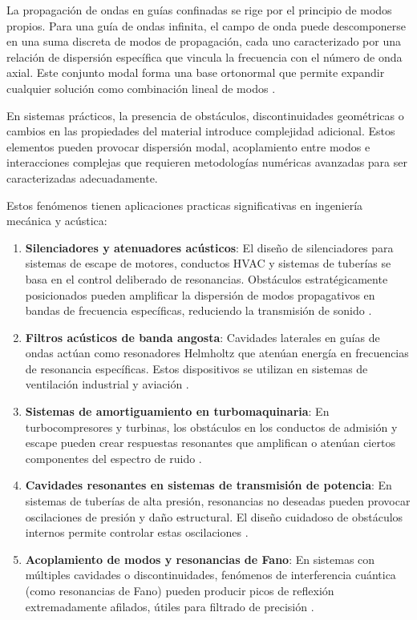 \documentclass[11pt]{article}
\begin{document}
La propagación de ondas en guías confinadas se rige por el principio de modos propios. Para una guía de ondas infinita, el campo de onda puede descomponerse en una suma discreta de modos de propagación, cada uno caracterizado por una relación de dispersión específica que vincula la frecuencia con el número de onda axial. Este conjunto modal forma una base ortonormal que permite expandir cualquier solución como combinación lineal de modos \cite{Dostart2017}.

En sistemas prácticos, la presencia de obstáculos, discontinuidades geométricas o cambios en las propiedades del material introduce complejidad adicional. Estos elementos pueden provocar dispersión modal, acoplamiento entre modos e interacciones complejas que requieren metodologías numéricas avanzadas para ser caracterizadas adecuadamente.

Estos fenómenos tienen aplicaciones practicas significativas en ingeniería mecánica y acústica:

\begin{enumerate}
\item \textbf{Silenciadores y atenuadores acústicos}: El diseño de silenciadores para sistemas de escape de motores, conductos HVAC y sistemas de tuberías se basa en el control deliberado de resonancias. Obstáculos estratégicamente posicionados pueden amplificar la dispersión de modos propagativos en bandas de frecuencia específicas, reduciendo la transmisión de sonido \cite{Kirby2005}.

\item \textbf{Filtros acústicos de banda angosta}: Cavidades laterales en guías de ondas actúan como resonadores Helmholtz que atenúan energía en frecuencias de resonancia específicas. Estos dispositivos se utilizan en sistemas de ventilación industrial y aviación \cite{Alkuhayli2025}.

\item \textbf{Sistemas de amortiguamiento en turbomaquinaria}: En turbocompresores y turbinas, los obstáculos en los conductos de admisión y escape pueden crear respuestas resonantes que amplifican o atenúan ciertos componentes del espectro de ruido \cite{Rämmal2009}.

\item \textbf{Cavidades resonantes en sistemas de transmisión de potencia}: En sistemas de tuberías de alta presión, resonancias no deseadas pueden provocar oscilaciones de presión y daño estructural. El diseño cuidadoso de obstáculos internos permite controlar estas oscilaciones \cite{Hein2012}.

\item \textbf{Acoplamiento de modos y resonancias de Fano}: En sistemas con múltiples cavidades o discontinuidades, fenómenos de interferencia cuántica (como resonancias de Fano) pueden producir picos de reflexión extremadamente afilados, útiles para filtrado de precisión \cite{Kronowetter2023}.

\end{enumerate}
\end{document}
